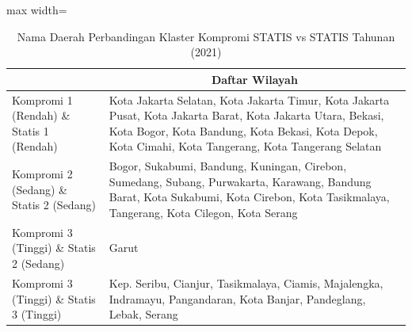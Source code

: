 \begin{table}[H]
\centering
\caption{Nama Daerah Perbandingan Klaster Kompromi STATIS vs STATIS Tahunan (2021)} \label{tab:app2comp_statis_name_2021}
\begin{adjustbox}{max width=\textwidth}
\begin{tabular}{|>{\centering\arraybackslash}p{4cm}|p{10cm}|}
\hline
\multicolumn{1}{|c|}{\textbf{Kategori}} & \multicolumn{1}{c|}{\textbf{Daftar Wilayah}} \\
\hline
Kompromi 1 (Rendah) \& Statis 1 (Rendah) & Kota Jakarta Selatan, Kota Jakarta Timur, Kota Jakarta Pusat, Kota Jakarta Barat, Kota Jakarta Utara, Bekasi, Kota Bogor, Kota Bandung, Kota Bekasi, Kota Depok, Kota Cimahi, Kota Tangerang, Kota Tangerang Selatan \\
\hline
Kompromi 2 (Sedang) \& Statis 2 (Sedang) & Bogor, Sukabumi, Bandung, Kuningan, Cirebon, Sumedang, Subang, Purwakarta, Karawang, Bandung Barat, Kota Sukabumi, Kota Cirebon, Kota Tasikmalaya, Tangerang, Kota Cilegon, Kota Serang \\
\hline
Kompromi 3 (Tinggi) \& Statis 2 (Sedang) & Garut \\
\hline
Kompromi 3 (Tinggi) \& Statis 3 (Tinggi) & Kep. Seribu, Cianjur, Tasikmalaya, Ciamis, Majalengka, Indramayu, Pangandaran, Kota Banjar, Pandeglang, Lebak, Serang \\
\hline
\end{tabular}
\end{adjustbox}
\end{table}